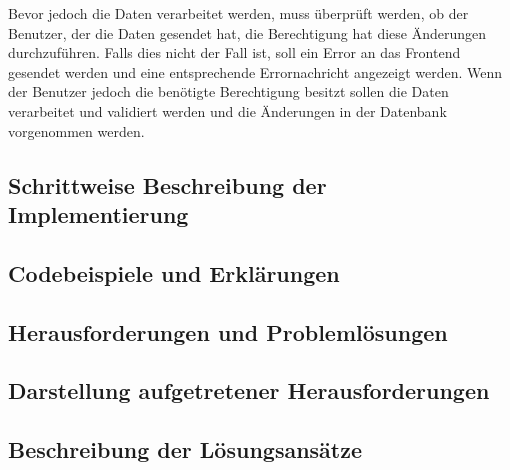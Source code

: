 Bevor jedoch die Daten verarbeitet werden, muss überprüft werden, ob der Benutzer, der die Daten gesendet hat, die Berechtigung hat diese Änderungen durchzuführen.
Falls dies nicht der Fall ist, soll ein Error an das Frontend gesendet werden und eine entsprechende Errornachricht angezeigt werden.
Wenn der Benutzer jedoch die benötigte Berechtigung besitzt sollen die Daten verarbeitet und validiert werden und die Änderungen in der Datenbank vorgenommen werden.

\subsection[Schrittweise Beschreibung der Implementierung]{Schrittweise Beschreibung der Implementierung}

\subsection[Codebeispiele und Erklärungen]{Codebeispiele und Erklärungen}

\subsection[Herausforderungen und Problemlösungen]{Herausforderungen und Problemlösungen}

\subsection[Darstellung aufgetretener Herausforderungen]{Darstellung aufgetretener Herausforderungen}

\subsection[Beschreibung der Lösungsansätze]{Beschreibung der Lösungsansätze}
